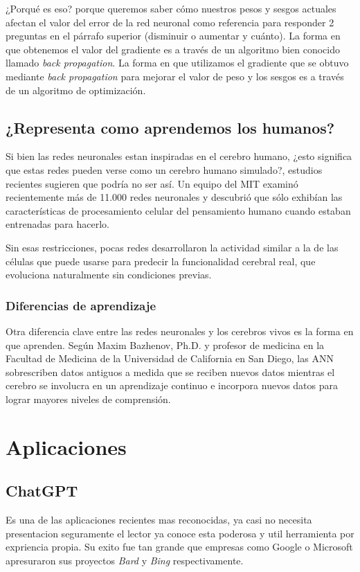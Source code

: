 \documentclass[runningheads]{llncs} %
\begin{document}
¿Porqué es eso? porque queremos saber cómo nuestros pesos y sesgos actuales afectan 
el valor del error de la red neuronal como referencia para responder 2 preguntas 
en el párrafo superior (disminuir o aumentar y cuánto). La forma en que obtenemos el valor 
del gradiente es a través de un algoritmo bien conocido llamado \textit{back propagation}. 
La forma en que utilizamos el gradiente que se obtuvo mediante \textit{back propagation} 
para mejorar el valor de peso y los sesgos es a través de un algoritmo de optimización.
\cite{backpropagation}

\subsection{¿Representa como aprendemos los humanos?}
Si bien las redes neuronales estan inspiradas en el cerebro humano, ¿esto significa 
que estas redes pueden verse como un cerebro humano simulado?, estudios recientes sugieren 
que podría no ser así. Un equipo del MIT examinó recientemente más de 11.000 redes neuronales 
y descubrió que sólo exhibían las características de procesamiento celular del pensamiento 
humano cuando estaban entrenadas para hacerlo. 

Sin esas restricciones, pocas redes desarrollaron la actividad similar a la de las células 
que puede usarse para predecir la funcionalidad cerebral real, que evoluciona naturalmente 
sin condiciones previas. \cite{NNvsANN}

\subsubsection{Diferencias de aprendizaje} 
Otra diferencia clave entre las redes neuronales y los cerebros vivos es la forma 
en que aprenden. Según Maxim Bazhenov, Ph.D. y profesor de medicina en la 
Facultad de Medicina de la Universidad de California en San Diego, 
las ANN sobrescriben datos antiguos a medida que se reciben nuevos datos mientras 
el cerebro se involucra en un aprendizaje continuo e incorpora nuevos datos para lograr 
mayores niveles de comprensión. \cite{NNvsANN}

\newpage
\section{Aplicaciones}
\subsection{ChatGPT}
Es una de las aplicaciones recientes mas reconocidas, ya casi no necesita presentacion
seguramente el lector ya conoce esta poderosa y util herramienta por expriencia propia.
Su exito fue tan grande que empresas como Google o Microsoft apresuraron sus proyectos
\textit{Bard} y \textit{Bing} respectivamente.
\end{document}
